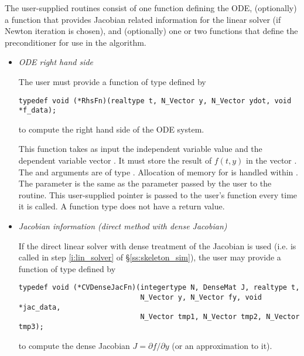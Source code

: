 The user-supplied routines consist of one function defining the ODE, 
(optionally) a function that provides Jacobian related information for the linear 
solver (if Newton iteration is chosen), and (optionally) one or two functions 
that define the preconditioner for use in the {\spgmr} algorithm. 

\begin{itemize}
%
%
\item {\em ODE right hand side}

  The user must provide a function of type  defined by
\begin{verbatim}
typedef void (*RhsFn)(realtype t, N_Vector y, N_Vector ydot, void *f_data);
\end{verbatim}
  to compute the right hand side of the ODE system.
  
  This function takes as input the independent variable  
  value  and the dependent variable vector .  It must store the    
  result of $f(t,y)$ in the vector .  The  and  arguments 
  are of type . Allocation of memory for  is handled within {\cvode}.
  The  parameter is the same as the  parameter passed by 
  the user to the  routine. This user-supplied pointer is passed to 
  the user's  function every time it is called.                                       
  A  function type does not have a return value.                        
%
%
\item {\em Jacobian information (direct method with dense Jacobian)}
  \label{p:djac}
  
  If the direct linear solver with dense treatment of the Jacobian is used 
  (i.e.  is called in step \ref{i:lin_solver} of \S\ref{ss:skeleton_sim}), 
  the user may provide a function of type  defined by
\begin{verbatim}
typedef void (*CVDenseJacFn)(integertype N, DenseMat J, realtype t, 
                             N_Vector y, N_Vector fy, void *jac_data,
                             N_Vector tmp1, N_Vector tmp2, N_Vector tmp3);
\end{verbatim}
  to compute the dense Jacobian $J = \partial f / \partial y$ (or an approximation to it).
  

\end{itemize}
